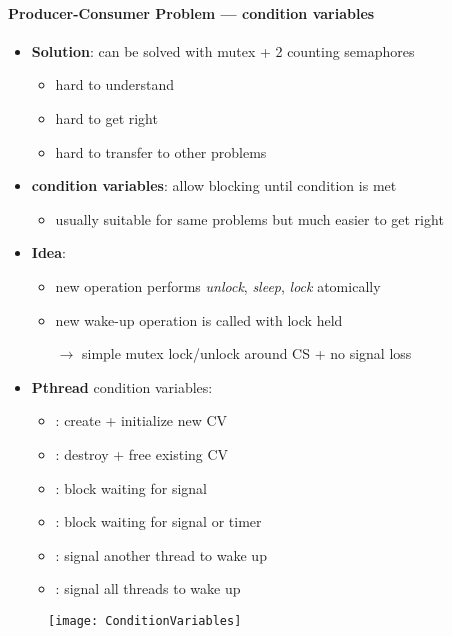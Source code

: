 \paragraph{Producer-Consumer Problem --- condition variables}
\begin{itemize}
  \item \textbf{Solution}: can be solved with mutex + 2 counting semaphores
  \begin{itemize}
    \item hard to understand
    \item hard to get right
    \item hard to transfer to other problems
  \end{itemize}
  \item \textbf{condition variables}: allow blocking until condition is met
  \begin{itemize}
    \item usually suitable for same problems but much easier to get right
  \end{itemize}
  \item \textbf{Idea}:
  \begin{itemize}
    \item new operation performs \emph{unlock}, \emph{sleep}, \emph{lock} atomically
    \item new wake-up operation is called with lock held
    \item[$ \to $] simple mutex lock/unlock around CS + no signal loss
  \end{itemize}
  \item \textbf{Pthread} condition variables:
  \begin{itemize}
    \item {}: create + initialize new CV
    \item {}: destroy + free existing CV
    \item {}: block waiting for signal
    \item {}: block waiting for signal or timer
    \item {} : signal another thread to wake up
    \item {}: signal all threads to wake up
  \end{itemize}
\end{itemize}
\begin{figure}[h]\centering\label{ConditionVariables}\texttt{[image: ConditionVariables]}\end{figure}

